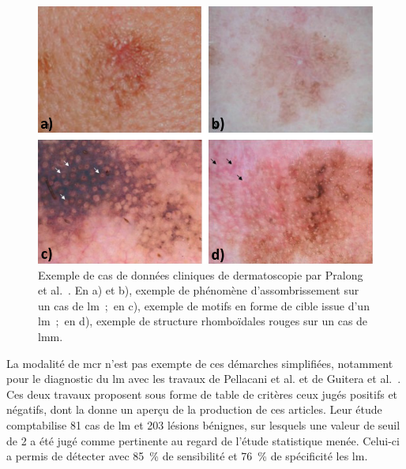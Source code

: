 \begin{figure}[H]
    \begin{center}
        \includegraphics[width=\linewidth]{contents/chapter_4/resources/example_dermoscopy_pattern.pdf}
        \caption{Exemple de cas de données cliniques de dermatoscopie par Pralong et al.~\cite{Pralong2012}. En a) et b), exemple de phénomène d'assombrissement sur un cas de \gls{lm}~;~en c), exemple de motifs en forme de cible issue d'un \gls{lm}~;~en d), exemple de structure rhomboïdales rouges sur un cas de \gls{lmm}.}
        \label{fig:example_dermoscopy_pattern}
    \end{center} 
\end{figure}\par

La modalité de \gls{mcr} n'est pas exempte de ces démarches simplifiées, notamment pour le diagnostic du \gls{lm} avec les travaux de Pellacani et al. et de Guitera et al.~\cite{Pellacani2007, Guitera2010}. Ces deux travaux proposent sous forme de table de critères ceux jugés positifs et négatifs, dont la  donne un aperçu de la production de ces articles. Leur étude comptabilise 81 cas de \gls{lm} et 203 lésions bénignes, sur lesquels une valeur de seuil de 2 a été jugé comme pertinente au regard de l'étude statistique menée. Celui-ci a permis de détecter avec 85~\% de sensibilité et 76~\% de spécificité les \gls{lm}.\par

